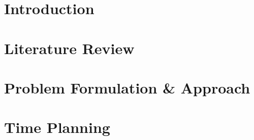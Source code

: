 \documentclass[12pt,twoside]{report}
\begin{document}

\thispagestyle{empty}







\chapter{Introduction}



\chapter{Literature Review}



\chapter{Problem Formulation \& Approach}


\chapter{Time Planning}




\newpage


\end{document}
